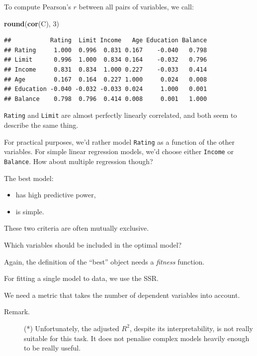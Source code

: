 \documentclass[10pt,b5paper,krantz1]{krantz}
\newenvironment{Shaded}{\begin{snugshade}}{\end{snugshade}}
\newcommand{\DecValTok}[1]{\textcolor[rgb]{0.06,0.06,0.06}{#1}}
\newcommand{\KeywordTok}[1]{\textcolor[rgb]{0.27,0.27,0.27}{\textbf{#1}}}
\newcommand{\NormalTok}[1]{#1}
\providecommand{\tightlist}{%
  \setlength{\itemsep}{0pt}\setlength{\parskip}{0pt}}
\begin{document}
To compute Pearson's \(r\) between all pairs of variables, we call:

\begin{Shaded}
\begin{Highlighting}[]
\KeywordTok{round}\NormalTok{(}\KeywordTok{cor}\NormalTok{(C), }\DecValTok{3}\NormalTok{)}
\end{Highlighting}
\end{Shaded}

\begin{verbatim}
##           Rating  Limit Income   Age Education Balance
## Rating     1.000  0.996  0.831 0.167    -0.040   0.798
## Limit      0.996  1.000  0.834 0.164    -0.032   0.796
## Income     0.831  0.834  1.000 0.227    -0.033   0.414
## Age        0.167  0.164  0.227 1.000     0.024   0.008
## Education -0.040 -0.032 -0.033 0.024     1.000   0.001
## Balance    0.798  0.796  0.414 0.008     0.001   1.000
\end{verbatim}

\texttt{Rating} and \texttt{Limit} are almost perfectly linearly correlated,
and both seem to describe the same thing.

For practical purposes, we'd rather model \texttt{Rating} as a function of the other variables.
For simple linear regression models, we'd choose either \texttt{Income} or \texttt{Balance}.
How about multiple regression though?

The best model:

\begin{itemize}
\tightlist
\item
  has high predictive power,
\item
  is simple.
\end{itemize}

These two criteria are often mutually exclusive.

Which variables should be included in the optimal model?

Again, the definition of the ``best'' object needs a \emph{fitness} function.

For fitting a single model to data, we use the SSR.

We need a metric that takes the number of dependent variables into account.

\begin{description}
\item[Remark.]
(*) Unfortunately, the adjusted \(R^2\), despite its interpretability,
is not really suitable for this task. It does not penalise complex models
heavily enough to be really useful.
\end{description}
\end{document}
